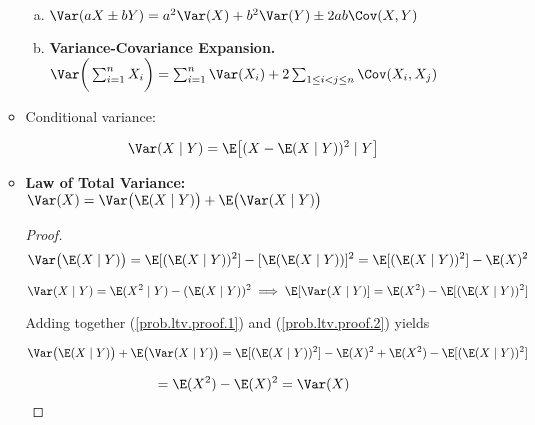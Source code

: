 \begin{itemize}
\begin{itemize}
\begin{theorem}
\begin{enumerate}[(a)]
\item \(\Var(aX \pm bY) = a^2\Var(X) + b^2\Var(Y) \pm 2ab \Cov(X, Y)\) 

\item \textbf{Variance-Covariance Expansion.}  \(\Var \bigg( \sum_{i=1}^n X_i \bigg) = \sum_{i=1}^n \Var(X_i) + 2 \sum_{1 \leq i < j \leq n} \Cov(X_i, X_j)\)

%

\end{enumerate}
\end{theorem}

\item \begin{definition} Conditional variance: 

\[
\Var(X \mid Y) = \E \big[ (X - \E(X \mid Y))^2 \mid Y \big]
\] 

\end{definition}

\item \begin{theorem}\label{prob.ltv} \textbf{Law of Total Variance:} \( \Var(X) = \Var \big( \E(X \mid Y) \big) + \E \big( \Var(X \mid Y) \big) \)\end{theorem}

\begin{proof}

\begin{equation}\label{prob.ltv.proof.1}
\Var \big( \E(X \mid Y) \big) =\E[( \E(X \mid Y))^2]  - [\E( \E(X \mid Y))]^2 =  \E[( \E(X \mid Y))^2] - \E(X)^2
\end{equation}

\begin{equation}\label{prob.ltv.proof.2}
\Var(X \mid Y) = \E(X^2 \mid Y) - ( \E(X \mid Y))^2 \implies \E[\Var(X \mid Y)] = \E(X^2) - \E[( \E(X \mid Y))^2]
\end{equation}

Adding together (\ref{prob.ltv.proof.1}) and (\ref{prob.ltv.proof.2}) yields

\[
\Var \big( \E(X \mid Y) \big) + \E \big( \Var(X \mid Y) \big) = \E[( \E(X \mid Y))^2]  - \E(X)^2 +  \E(X^2) - \E[( \E(X \mid Y))^2] 
\]

\[
= \E(X^2) - \E(X)^2 = \Var(X)
\]


\end{proof}
\end{itemize}
\end{itemize}
